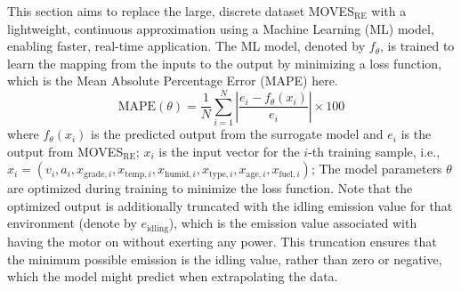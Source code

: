 \documentclass[12pt,english]{article}
\begin{document}
This section aims to replace the large, discrete dataset {MOVES}$_\text{RE}$ with a lightweight, continuous approximation using a Machine Learning (ML) model, enabling faster, real-time application.
The ML model, denoted by \( f_\theta \), is trained to learn the mapping from the inputs to the output by minimizing a loss function, which is the Mean Absolute Percentage Error (MAPE) here.
\begin{equation}
\text{MAPE}(\theta) = \frac{1}{N} \sum_{i=1}^{N} \left| \frac{e_i - f_\theta(x_i)}{e_i} \right| \times 100    
\end{equation}
where \( f_\theta(x_i) \) is the predicted output from the surrogate model and \( e_i \) is the output from {MOVES}$_\text{RE}$; 
$x_i$ is the input vector for the $i$-th training sample, i.e., $x_i = (v_i, a_i, x_{\text{grade},i}, x_{\text{temp},i}, x_{\text{humid},i}, x_{\text{type},i}, x_{\text{age},i}, x_{\text{fuel},i})$;
The model parameters \( \theta \) are optimized during training to minimize the loss function.
Note that the optimized output is additionally truncated with the idling emission value for that environment (denote by $e_\text{idling}$), which is the emission value associated with having the motor on without exerting any power. %
This truncation ensures that the minimum possible emission is the idling value, rather than zero or negative, which the model might predict when extrapolating the data.
\end{document}
